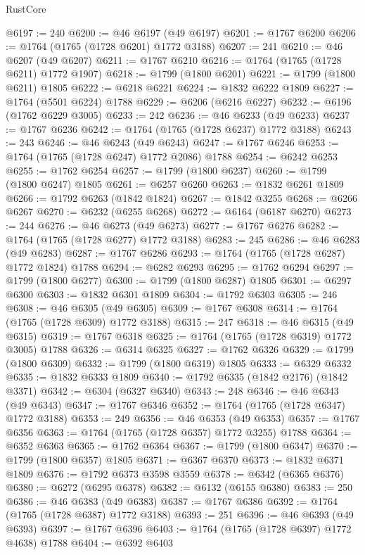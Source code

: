 \begin{lexlean}{RustCore}
\begin{coremodule}
@6197 := 240
@6200 := @46 @6197 (@49 @6197)
@6201 := @1767 @6200
@6206 := @1764 (@1765 (@1728 @6201) @1772 @3188)
@6207 := 241
@6210 := @46 @6207 (@49 @6207)
@6211 := @1767 @6210
@6216 := @1764 (@1765 (@1728 @6211) @1772 @1907)
@6218 := @1799 (@1800 @6201)
@6221 := @1799 (@1800 @6211) @1805
@6222 := @6218 @6221
@6224 := @1832 @6222 @1809
@6227 := @1764 (@5501 @6224) @1788
@6229 := @6206 (@6216 @6227)
@6232 := @6196 (@1762 @6229 @3005)
@6233 := 242
@6236 := @46 @6233 (@49 @6233)
@6237 := @1767 @6236
@6242 := @1764 (@1765 (@1728 @6237) @1772 @3188)
@6243 := 243
@6246 := @46 @6243 (@49 @6243)
@6247 := @1767 @6246
@6253 := @1764 (@1765 (@1728 @6247) @1772 @2086) @1788
@6254 := @6242 @6253
@6255 := @1762 @6254
@6257 := @1799 (@1800 @6237)
@6260 := @1799 (@1800 @6247) @1805
@6261 := @6257 @6260
@6263 := @1832 @6261 @1809
@6266 := @1792 @6263 (@1842 @1824)
@6267 := @1842 @3255
@6268 := @6266 @6267
@6270 := @6232 (@6255 @6268)
@6272 := @6164 (@6187 @6270)
@6273 := 244
@6276 := @46 @6273 (@49 @6273)
@6277 := @1767 @6276
@6282 := @1764 (@1765 (@1728 @6277) @1772 @3188)
@6283 := 245
@6286 := @46 @6283 (@49 @6283)
@6287 := @1767 @6286
@6293 := @1764 (@1765 (@1728 @6287) @1772 @1824) @1788
@6294 := @6282 @6293
@6295 := @1762 @6294
@6297 := @1799 (@1800 @6277)
@6300 := @1799 (@1800 @6287) @1805
@6301 := @6297 @6300
@6303 := @1832 @6301 @1809
@6304 := @1792 @6303
@6305 := 246
@6308 := @46 @6305 (@49 @6305)
@6309 := @1767 @6308
@6314 := @1764 (@1765 (@1728 @6309) @1772 @3188)
@6315 := 247
@6318 := @46 @6315 (@49 @6315)
@6319 := @1767 @6318
@6325 := @1764 (@1765 (@1728 @6319) @1772 @3005) @1788
@6326 := @6314 @6325
@6327 := @1762 @6326
@6329 := @1799 (@1800 @6309)
@6332 := @1799 (@1800 @6319) @1805
@6333 := @6329 @6332
@6335 := @1832 @6333 @1809
@6340 := @1792 @6335 (@1842 @2176) (@1842 @3371)
@6342 := @6304 (@6327 @6340)
@6343 := 248
@6346 := @46 @6343 (@49 @6343)
@6347 := @1767 @6346
@6352 := @1764 (@1765 (@1728 @6347) @1772 @3188)
@6353 := 249
@6356 := @46 @6353 (@49 @6353)
@6357 := @1767 @6356
@6363 := @1764 (@1765 (@1728 @6357) @1772 @3255) @1788
@6364 := @6352 @6363
@6365 := @1762 @6364
@6367 := @1799 (@1800 @6347)
@6370 := @1799 (@1800 @6357) @1805
@6371 := @6367 @6370
@6373 := @1832 @6371 @1809
@6376 := @1792 @6373 @3598 @3559
@6378 := @6342 (@6365 @6376)
@6380 := @6272 (@6295 @6378)
@6382 := @6132 (@6155 @6380)
@6383 := 250
@6386 := @46 @6383 (@49 @6383)
@6387 := @1767 @6386
@6392 := @1764 (@1765 (@1728 @6387) @1772 @3188)
@6393 := 251
@6396 := @46 @6393 (@49 @6393)
@6397 := @1767 @6396
@6403 := @1764 (@1765 (@1728 @6397) @1772 @4638) @1788
@6404 := @6392 @6403

\end{coremodule}
\end{lexlean}
